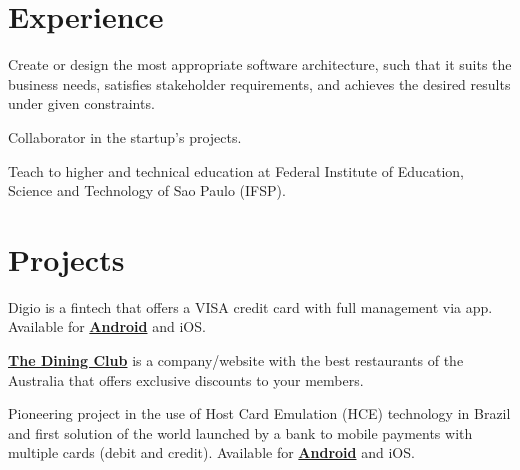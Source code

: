 \documentclass[]{resume}
\begin{document}
\hfill
\begin{minipage}[t]{0.66\textwidth} 


\section{Experience}
Create or design the most appropriate software architecture, such that it suits the business needs, satisfies stakeholder requirements, and achieves the desired results under given constraints.
\sectionsep

Collaborator in the startup's projects.
\sectionsep

Teach to higher and technical education at Federal Institute of Education, Science and Technology of Sao Paulo (IFSP).
\sectionsep


\section{Projects}

Digio is a fintech that offers a VISA credit card with full management via app. Available for \textbf{\href{https://goo.gl/zvebsh}{Android}} and iOS.
\sectionsep

\textbf{\href{https://www.thediningclub.com.au}{The Dining Club}} is a company/website with the best restaurants of the Australia that offers exclusive discounts to your members.
\sectionsep

Pioneering project in the use of Host Card Emulation (HCE) technology in Brazil and first solution of the world launched by a bank to mobile payments with multiple cards (debit and credit). Available for \textbf{\href{https://goo.gl/T7oLwj}{Android}} and iOS.
\sectionsep


\end{minipage}
\end{document}
